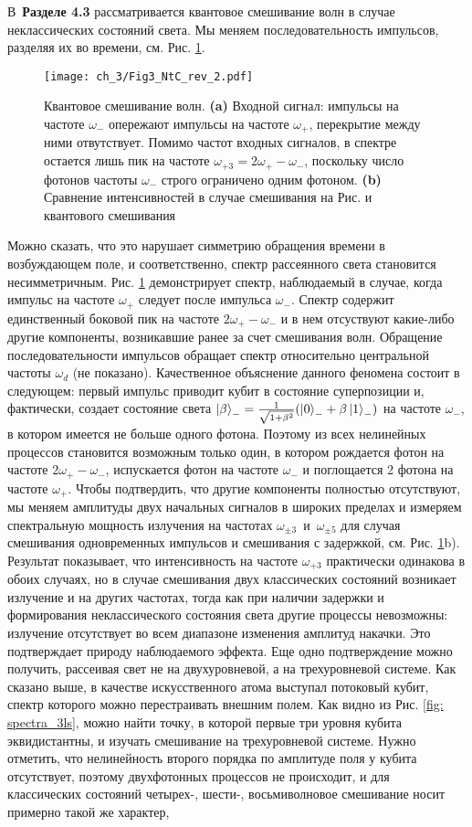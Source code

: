В~\textbf{Разделе 4.3} рассматривается квантовое смешивание волн в случае неклассических состояний света. Мы меняем последовательность импульсов, разделяя их во времени, см. Рис. \ref{fig: qwm}.
\begin{figure}[htb]\center
	\texttt{[image: ch\_3/Fig3\_NtC\_rev\_2.pdf]}
	\caption{Квантовое смешивание волн. \textbf{(a)} Входной сигнал: импульсы на частоте $\omega_{-}$ опережают импульсы на частоте $\omega_+$, перекрытие между ними отвутствует. Помимо частот входных сигналов, в спектре остается лишь пик на частоте $\omega_{+3}=2\omega_+-\omega_-$, поскольку число фотонов частоты $\omega_-$ строго ограничено одним фотоном. \textbf{(b)} Сравнение интенсивностей в случае смешивания на Рис.  и квантового смешивания}
	\label{fig: qwm}	
\end{figure}
Можно сказать, что это нарушает симметрию обращения времени в возбуждающем поле, и соответственно, спектр рассеянного света становится несимметричным. Рис. \ref{fig: qwm} демонстрирует спектр, наблюдаемый в случае, когда импульс на частоте $\omega_+$ следует после импульса $\omega_-$. Спектр содержит единственный боковой пик на частоте $2\omega_+-\omega_-$ и в нем отсуствуют какие-либо другие компоненты, возникавшие ранее за счет смешивания волн. Обращение последовательности импульсов обращает спектр относительно центральной частоты $\omega_d$ (не показано). Качественное объяснение данного феномена состоит в следующем: первый импульс приводит кубит в состояние суперпозиции и, фактически, создает состояние света $\ket{\beta}_- = \frac{1}{\sqrt{1+\beta^2}}(\ket{0}_-+\beta\ket{1}_-)$ на частоте $\omega_-$, в котором имеется не больше одного фотона. Поэтому из всех нелинейных процессов становится возможным только один, в котором рождается фотон на частоте $2\omega_+-\omega_-$, испускается фотон на частоте $\omega_-$ и поглощается 2 фотона на частоте $\omega_+$. Чтобы подтвердить, что другие компоненты полностью отсутствуют, мы меняем амплитуды двух начальных сигналов в широких пределах и измеряем спектральную мощность излучения на частотах $\omega_{\pm3}$~и~$ \omega_{\pm5}$ для случая смешивания одновременных импульсов и смешивания с задержкой, см. Рис. \ref{fig: qwm}b). Результат показывает, что интенсивность на частоте $\omega_{+3}$ практически одинакова в обоих случаях, но в случае смешивания двух классических состояний возникает излучение и на других частотах, тогда как при наличии задержки и формирования неклассического состояния света другие процессы невозможны: излучение отсутствует во всем диапазоне изменения амплитуд накачки. Это подтверждает природу наблюдаемого эффекта. Еще одно подтверждение можно получить, рассеивая свет не на двухуровневой, а на трехуровневой системе. Как сказано выше, в качестве искусственного атома выступал потоковый кубит, спектр которого можно перестраивать внешним полем. Как видно из Рис. \ref{fig: spectra_3ls}, можно найти точку, в которой первые три уровня кубита эквидистантны, и изучать смешивание на трехуровневой системе. Нужно отметить, что нелинейность второго порядка по амплитуде поля у кубита отсутствует, поэтому двухфотонных процессов не происходит, и для классических состояний четырех-, шести-, восьмиволновое смешивание носит примерно такой же характер, 